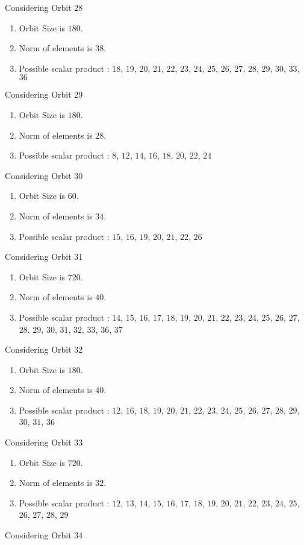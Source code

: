 \documentclass[12pt]{article}
\begin{document}
Considering Orbit 28
\begin{enumerate}
\item Orbit Size is $180$.
\item Norm of elements is $38$.
\item Possible scalar product : $18$, $19$, $20$, $21$, $22$, $23$, $24$, $25$, $26$, $27$, $28$, $29$, $30$, $33$, $36$
\end{enumerate}
Considering Orbit 29
\begin{enumerate}
\item Orbit Size is $180$.
\item Norm of elements is $28$.
\item Possible scalar product : $8$, $12$, $14$, $16$, $18$, $20$, $22$, $24$
\end{enumerate}
Considering Orbit 30
\begin{enumerate}
\item Orbit Size is $60$.
\item Norm of elements is $34$.
\item Possible scalar product : $15$, $16$, $19$, $20$, $21$, $22$, $26$
\end{enumerate}
Considering Orbit 31
\begin{enumerate}
\item Orbit Size is $720$.
\item Norm of elements is $40$.
\item Possible scalar product : $14$, $15$, $16$, $17$, $18$, $19$, $20$, $21$, $22$, $23$, $24$, $25$, $26$, $27$, $28$, $29$, $30$, $31$, $32$, $33$, $36$, $37$
\end{enumerate}
Considering Orbit 32
\begin{enumerate}
\item Orbit Size is $180$.
\item Norm of elements is $40$.
\item Possible scalar product : $12$, $16$, $18$, $19$, $20$, $21$, $22$, $23$, $24$, $25$, $26$, $27$, $28$, $29$, $30$, $31$, $36$
\end{enumerate}
Considering Orbit 33
\begin{enumerate}
\item Orbit Size is $720$.
\item Norm of elements is $32$.
\item Possible scalar product : $12$, $13$, $14$, $15$, $16$, $17$, $18$, $19$, $20$, $21$, $22$, $23$, $24$, $25$, $26$, $27$, $28$, $29$
\end{enumerate}
Considering Orbit 34
\end{document}
